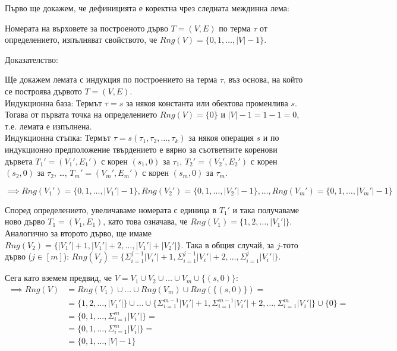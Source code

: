\documentclass[12pt,twoside,a4paper]{article}
\begin{document}
	Първо ще докажем, че дефиницията е коректна чрез следната междинна лема:
	\begin{lemma} Номерата на върховете за построеното дърво $T=(V,E)$ по терма $\tau$ от определението, изпълняват свойството, че $Rng(V)=\{0, 1, \dots, |V|-1\}$.
		
		\noindent Доказателство:
		
		Ще докажем лемата с индукция по построението на терма $\tau$, въз основа, на който се построява дървото $T=(V,E)$.\\
		\indent Индукционна база: Термът $\tau = s$ за някоя константа или обектова променлива $s$.\\
		Тогава от първата точка на определението $Rng(V)=\{0\}$ и $|V|-1=1-1=0$, т.е. лемата е изпълнена.\\
		\indent Индукционна стъпка: Термът $\tau = s(\tau_1, \tau_2, \dots, \tau_k)$ за някоя операция $s$ и по индукционно предположение твърдението е вярно за съответните коренови дървета $T_1'=(V_1',E_1')$ с корен $(s_1, 0)$ за $\tau_1$, $T_2'=(V_2',E_2')$ с корен $(s_2, 0)$ за $\tau_2$, \dots, $T_m'=(V_m',E_m')$ с корен $(s_m, 0)$ за $\tau_m$.
		
		\noindent$\implies Rng(V_1')=\{0, 1, \dots, |V_1'|-1\}, Rng(V_2')=\{0, 1, \dots, |V_2'|-1\}, \dots, Rng(V_m')=\{0, 1, \dots, |V_m'|-1\}$
		
		Според определението, увеличаваме номерата с единица в $T_1'$ и така получаваме ново дърво $T_1=(V_1,E_1)$, като това означава, че $Rng(V_1)=\{1, 2, \dots, |V_1'|\}$. Аналогично за второто дърво, ще имаме $Rng(V_2)=\{|V_1'|+1, |V_1'|+2, \dots, |V_1'|+|V_2'|\}$. Така в общия случай, за $j$-тото дърво ($j \in [m]$): $Rng(V_j)=\{\Sigma_{i=1}^{j-1}{|V_i'|}+1, \Sigma_{i=1}^{j-1}{|V_i'|}+2, \dots, \Sigma_{i=1}^{j}{|V_i'|}\}$.
		
		Сега като вземем предвид, че $V=V_1 \cup V_2 \cup \dots \cup V_m \cup \{(s, 0)\}$:\\
		\vspace{-0.2cm}
		\begin{equation*}
			\begin{split}
				\implies Rng(V)
				&= Rng(V_1) \cup \dots \cup Rng(V_m) \cup Rng(\{(s, 0)\}) = \\
				&= \{1, 2, \dots, |V_1'|\} \cup \dots \cup \{\Sigma_{i=1}^{m-1}{|V_i'|}+1, \Sigma_{i=1}^{m-1}{|V_i'|}+2, \dots, \Sigma_{i=1}^{m}{|V_i'|}\} \cup \{0\} =\\
				&= \{0, 1, \dots, \Sigma_{i=1}^{m}{|V_i'|}\} =\\
				&= \{0, 1, \dots, \Sigma_{i=1}^{m}{|V_i|}\} =\\
				&= \{0, 1, \dots, |V|-1\}
			\end{split}
		\end{equation*}
	\end{lemma}
	
\end{document}
